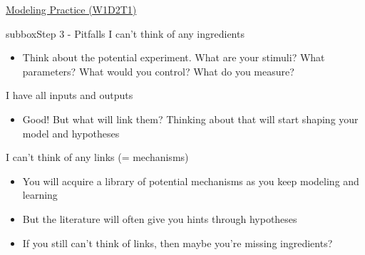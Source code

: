\begin{textbox}{\href{https://compneuro.neuromatch.io/tutorials/W1D2_ModelingPractice/W1D2_Intro.html}{Modeling Practice  (W1D2T1)} }
\begin{subbox}{subbox}{Step 3 - Pitfalls }
I can’t think of any ingredients
\begin{itemize}
    \item Think about the potential experiment. What are your stimuli? What parameters? What would you control? What do you measure? \end{itemize} 

I have all inputs and outputs
 \begin{itemize}
    \item Good! But what will link them? Thinking about that will start shaping your model and hypotheses \end{itemize} 

I can’t think of any links (= mechanisms)
 \begin{itemize}
    \item You will acquire a library of potential mechanisms as you keep modeling and learning
   \item But the literature will often give you hints through hypotheses
  \item If you still can't think of links, then maybe you're missing ingredients?
 \end{itemize} 
 \end{subbox}
 
 
\end{textbox}



